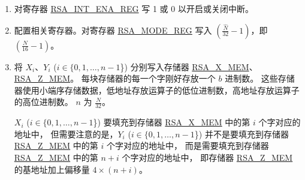 \documentclass[main\_\_CN.tex]{subfiles}
\begin{document}
\begin{enumerate}

    \item 对寄存器 \hyperref[regdesc:RSAINTENAREG]{RSA\_INT\_ENA\_REG} 写 1 或 0 以开启或关闭中断。

    \item 配置相关寄存器。对寄存器 \hyperref[regdesc:RSAMODEREG]{RSA\_MODE\_REG} 写入 \begin{math}( \frac{\hat{N}}{32} - 1 )\end{math}，即 \begin{math}(  \frac{N}{16} - 1 )\end{math}。

    \item 将 \begin{math}{X}_{i}\end{math}、\begin{math}{Y}_{i}\end{math} (\begin{math}i \in \{ 0, 1, \dots, n-1 \end{math}\}) 分别写入存储器 \hyperref[tab:rsa-mem]{RSA\_X\_MEM}、\hyperref[tab:rsa-mem]{RSA\_Z\_MEM}。
        每块存储器的每一个字刚好存放一个 \begin{math}b\end{math} 进制数。
        这些存储器使用小端序存储数据，低地址存放运算子的低位进制数，高地址存放运算子的高位进制数。
        \begin{math}n\end{math} 为 \begin{math} \frac{N}{32} \end{math}。

         \begin{math}{X}_{i}\end{math} (\begin{math}i \in \{ 0, 1, \dots, n-1 \end{math}\}) 要填充到存储器 \hyperref[tab:rsa-mem]{RSA\_X\_MEM} 中的第 \begin{math}i\end{math} 个字对应的地址中，
        但需要注意的是，\begin{math}{Y}_{i}\end{math} (\begin{math}i\in\{ 0, 1, \dots, n-1 \end{math}\}) 并不是要填充到存储器 \hyperref[tab:rsa-mem]{RSA\_Z\_MEM} 中的第 \begin{math}i\end{math} 个字对应的地址中，
        而是需要填充到存储器 \hyperref[tab:rsa-mem]{RSA\_Z\_MEM} 中的第 \begin{math}n+i\end{math} 个字对应的地址中，
        即存储器 \hyperref[tab:rsa-mem]{RSA\_Z\_MEM} 的基地址加上偏移量 \begin{math}4 \times (n+i) \end{math}。


\end{enumerate}
\end{document}
